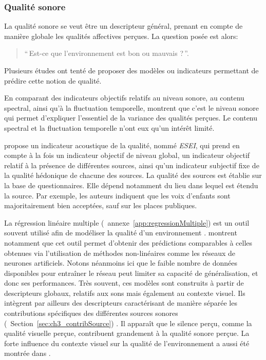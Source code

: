 \subsubsection{Qualité sonore}

La qualité sonore se veut être un descripteur général, prenant en compte de manière globale les qualités affectives perçues. La question posée est alors:

\begin{quote}
``\,Est-ce que l'environnement est bon ou mauvais ?\,''.
\end{quote}

 
Plusieurs études ont tenté de proposer des modèles ou indicateurs permettant de prédire cette notion de qualité.

En comparant des indicateurs objectifs relatifs au niveau sonore, au contenu spectral, ainsi qu'à la fluctuation temporelle, \citep{nilsson2006soundscape,nilsson2007acoustic} montrent que c'est le niveau sonore qui permet d'expliquer l'essentiel de la variance des qualités perçues. Le contenu spectral et la fluctuation temporelle n'ont eux qu'un intérêt limité.

\citep{garcia2012validation} propose un indicateur acoustique de la qualité, nommé \emph{ESEI}, qui prend en compte à la fois un indicateur objectif de niveau global, un indicateur objectif relatif à la présence de différentes sources, ainsi qu'un indicateur subjectif fixe de la qualité hédonique de chacune des sources. La qualité des sources est établie sur la base de questionnaires. Elle dépend notamment du lieu dans lequel est étendu la source. Par exemple, les auteurs indiquent que les voix d'enfants sont majoritairement bien acceptées, sauf sur les places publiques.

La régression linéaire multiple (\cf~annexe~\ref{app:regressionMultiple}) est un outil souvent utilisé afin de modéliser la qualité d'un environnement \citep{ricciardi2015sound}. \citep{brocolini2012prediction} montrent notamment que cet outil permet d'obtenir des prédictions comparables à celles obtenues via l'utilisation de méthodes non-linéaires comme les réseaux de neurones artificiels. Notons néanmoins ici que le faible nombre de données disponibles pour entraîner le réseau peut limiter sa capacité de généralisation, et donc ses performances. Très souvent, ces modèles sont construits à partir de descripteurs globaux, relatifs aux sons mais également au contexte visuel. Ils intègrent par ailleurs des descripteurs caractérisant de manière séparée les contributions spécifiques des différentes sources sonores (\cf~Section~\ref{sec:ch3_contribSource}) \citep{ricciardi2015sound,brocolini2012prediction}. Il apparaît que le silence perçu,  comme la qualité visuelle perçue, contribuent grandement à la qualité sonore perçue. La forte influence du contexte visuel sur la qualité de l'environnement a aussi été montrée dans \citep{hong2013designing}.

